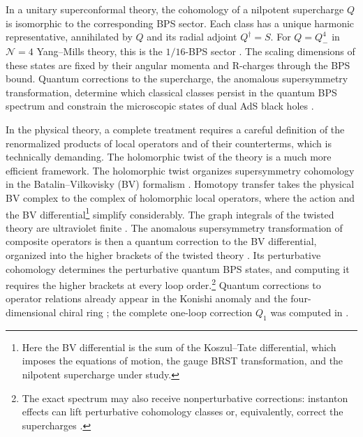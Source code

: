 \documentclass[11pt]{article}
\numberwithin{equation}{section}
\numberwithin{figure}{section}
\numberwithin{table}{section}
\begin{document}
In a unitary superconformal theory, the cohomology of a nilpotent supercharge $Q$ is isomorphic to the corresponding BPS sector. Each class has a unique harmonic representative, annihilated by $Q$ and its radial adjoint $Q^\dagger=S$. For $Q=Q^4_-$ in $\mathcal N=4$ Yang--Mills theory, this is the $1/16$-BPS sector \cite[Section 2]{ChangYin}. The scaling dimensions of these states are fixed by their angular momenta and R-charges through the BPS bound. Quantum corrections to the supercharge, the anomalous supersymmetry transformation, determine which classical classes persist in the quantum BPS spectrum and constrain the microscopic states of dual AdS black holes \cite{KonishiBH}.

In the physical theory, a complete treatment requires a careful definition of the renormalized products of local operators and of their counterterms, which is technically demanding. The holomorphic twist of the theory is a much more efficient framework. The holomorphic twist organizes supersymmetry cohomology in the Batalin--Vilkovisky (BV) formalism \cite{semichiral,BK}. Homotopy transfer takes the physical BV complex to the complex of holomorphic local operators, where the action and the BV differential\footnote{Here the BV differential is the sum of the Koszul--Tate differential, which imposes the equations of motion, the gauge BRST transformation, and the nilpotent supercharge under study.} simplify considerably. The graph integrals of the twisted theory are ultraviolet finite \cite[Theorem 5 and Corollary 4]{Wang}. The anomalous supersymmetry transformation of composite operators is then a quantum correction to the BV differential, organized into the higher brackets of the twisted theory \cite{higher,BK}. Its perturbative cohomology determines the perturbative quantum BPS states, and computing it requires the higher brackets at every loop order.\footnote{The exact spectrum may also receive nonperturbative corrections: instanton effects can lift perturbative cohomology classes \cite[Section 1]{semichiral} or, equivalently, correct the supercharges \cite[Section 2.2.1]{BK}.} Quantum corrections to operator relations already appear in the Konishi anomaly and the four-dimensional chiral ring \cite{Konishi,CDSW}; the complete one-loop correction $Q_1$ was computed in \cite{BK}.
\end{document}
